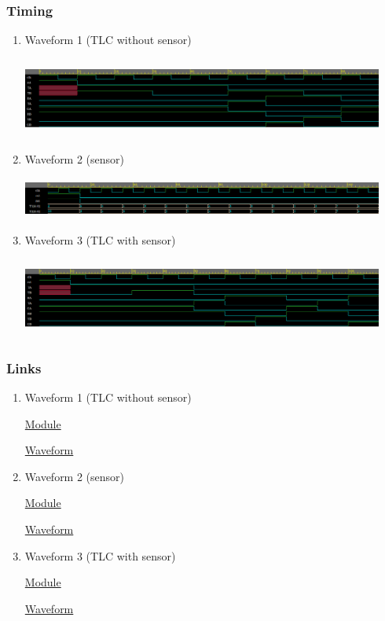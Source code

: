 \documentclass[11pt]{article}
\begin{document}
\subsubsection{Timing}
\label{sec:org57ed8fb}
\begin{enumerate}
\item Waveform 1 (TLC without sensor)
\label{sec:org3c016d2}
\begin{center}
\includegraphics[width=450px,height=100px]{./assets/TLC_waveform1.png}
\end{center}
\item Waveform 2 (sensor)
\label{sec:orge85b38e}
\begin{center}
\includegraphics[width=450px,height=50px]{./assets/TLC_waveform2.png}
\end{center}
\item Waveform 3 (TLC with sensor)
\label{sec:org9a32f58}
\begin{center}
\includegraphics[width=450px,height=100px]{./assets/TLC_waveform3.png}
\end{center}
\end{enumerate}
\subsubsection{Links}
\label{sec:orgec42580}
\begin{enumerate}
\item Waveform 1 (TLC without sensor)
\label{sec:org65b540e}

\href{https://www.edaplayground.com/x/3qgC}{Module}

\href{https://www.edaplayground.com/w/x/2yK}{Waveform}
\item Waveform 2 (sensor)
\label{sec:org871b854}

\href{https://www.edaplayground.com/x/4vEy}{Module}

\href{https://www.edaplayground.com/w/x/3tx}{Waveform}
\item Waveform 3 (TLC with sensor)
\label{sec:org7b87b07}

\href{https://www.edaplayground.com/x/ie6}{Module}

\href{https://www.edaplayground.com/w/x/cy}{Waveform}
\end{enumerate}
\end{document}
